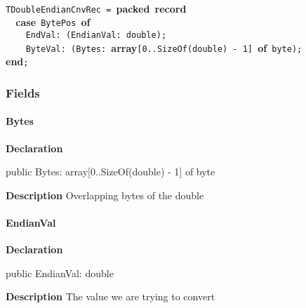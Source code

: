 \documentclass{report}
\begin{document}
 \texttt{\\\nopagebreak[3]
TDoubleEndianCnvRec~=~}\textbf{packed}\texttt{~}\textbf{record}\texttt{\\\nopagebreak[3]
~~}\textbf{case}\texttt{~BytePos~}\textbf{of}\texttt{\\\nopagebreak[3]
~~~~EndVal:~(EndianVal:~double);\\\nopagebreak[3]
~~~~ByteVal:~(Bytes:~}\textbf{array}\texttt{[0..SizeOf(double)~-~1]~}\textbf{of}\texttt{~byte);\\\nopagebreak[3]
}\textbf{end}\texttt{;\\
}\subsubsection*{\large{\textbf{Fields}}\normalsize\hspace{1ex}\hfill}
\paragraph*{Bytes}\hspace*{\fill}

\begin{list}{}{
\setlength{\itemindent}{0cm}
\setlength{\listparindent}{0cm}
\setlength{\leftmargin}{\evensidemargin}
\addtolength{\leftmargin}{\tmplength}
\settowidth{\labelsep}{X}
\addtolength{\leftmargin}{\labelsep}
\setlength{\labelwidth}{\tmplength}
}
\begin{flushleft}
\item[\textbf{Declaration}\hfill]
\begin{ttfamily}
public Bytes: array[0..SizeOf(double) - 1] of byte\end{ttfamily}


\end{flushleft}
\par
\item[\textbf{Description}]
Overlapping bytes of the double

\end{list}
\paragraph*{EndianVal}\hspace*{\fill}

\begin{list}{}{
\setlength{\itemindent}{0cm}
\setlength{\listparindent}{0cm}
\setlength{\leftmargin}{\evensidemargin}
\addtolength{\leftmargin}{\tmplength}
\settowidth{\labelsep}{X}
\addtolength{\leftmargin}{\labelsep}
\setlength{\labelwidth}{\tmplength}
}
\begin{flushleft}
\item[\textbf{Declaration}\hfill]
\begin{ttfamily}
public EndianVal: double\end{ttfamily}


\end{flushleft}
\par
\item[\textbf{Description}]
The value we are trying to convert

\end{list}
\end{document}
